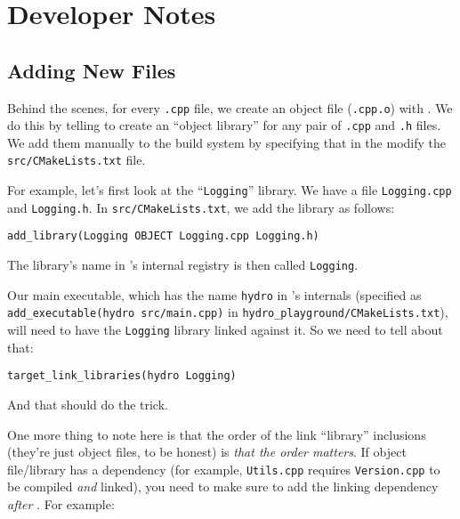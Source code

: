 \newpage
\section{Developer Notes}


\subsection{Adding New Files}

Behind the scenes, for every \verb|.cpp| file, we create an object file
(\verb|.cpp.o|) with \cmake. We do this by telling \cmake to create an ``object
library'' for any  pair of \verb|.cpp| and \verb|.h| files. We add them
manually to the \cmake build system by specifying that in the modify the
\verb|src/CMakeLists.txt| file.


For example, let's first look at the ``\verb|Logging|'' library. We have a file
\verb|Logging.cpp| and \verb|Logging.h|. In \verb|src/CMakeLists.txt|, we add
the library as follows:

\begin{lstlisting}
add_library(Logging OBJECT Logging.cpp Logging.h)
\end{lstlisting}

The library's name in \cmake's internal registry is then called
\verb|Logging|.

Our main executable, which has the name \verb|hydro| in \cmake's internals
(specified as \verb|add_executable(hydro src/main.cpp)| in
\verb|hydro_playground/CMakeLists.txt|), will need to have the \verb|Logging|
library linked against it. So we need to tell \cmake about that:

\begin{lstlisting}
target_link_libraries(hydro Logging)
\end{lstlisting}

And that should do the trick.

One more thing to note here is that the order of the link ``library''
inclusions (they're just object files, to be honest) is \emph{that the order
matters}. If object file/library  has a dependency  (for
example, \verb|Utils.cpp| requires \verb|Version.cpp| to be compiled \emph{and}
linked), you need to make sure to add the linking dependency 
\emph{after} . For example:


